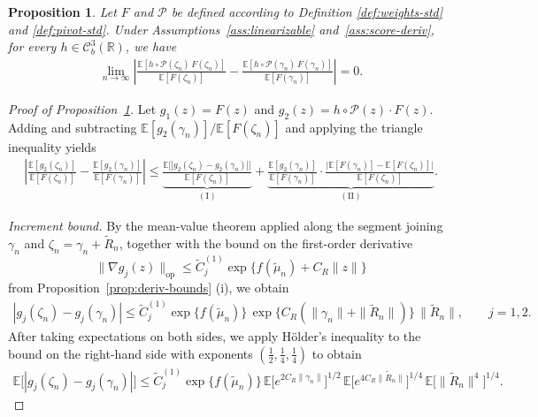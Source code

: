 \documentclass[12pt]{article}
\newcommand{\op}{\mathrm{op}}
\newtheorem{proposition}{Proposition}[section]
\newcommand{\real}{\mathbb{R}}
\newcommand{\Ee}{{\mathbb{E}}}
\newcommand{\cP}{{\mathcal{P}}}
\begin{document}
\begin{appendices}
\begin{proposition}
\label{prop:alr-remainder}
Let $F$ and $\cP$ be defined according to Definition \ref{def:weights-std} and \ref{def:pivot-std}. 
Under Assumptions~\ref{ass:linearizable} and~\ref{ass:score-deriv}, for
every $h\in\mathcal C^3_b(\real)$, we have
\begin{align}
  \label{eq:alr-swap}
  \lim_{n\to\infty}
  \left|
    \frac{\Ee[h\circ\cP(\zeta_n)\,F(\zeta_n)]}{\Ee[F(\zeta_n)]}
    -\frac{\Ee[h\circ\cP(\gamma_n)\,F(\gamma_n)]}{\Ee[F(\gamma_n)]}
  \right|=0.
\end{align}
\end{proposition}

\begin{proof}[Proof of Proposition~\ref{prop:alr-remainder}]
Let $g_1(z)=F(z)$ and $g_2(z)=h\circ\cP(z)\cdot F(z)$.
Adding and subtracting $\Ee[g_2(\gamma_n)]/\Ee[F(\zeta_n)]$
and applying the triangle inequality yields \begin{align*}
  \left|
    \frac{\Ee[g_2(\zeta_n)]}{\Ee[F(\zeta_n)]}
    -\frac{\Ee[g_2(\gamma_n)]}{\Ee[F(\gamma_n)]}
  \right|
  \le
  \underbrace{
    \frac{\Ee\big[|g_2(\zeta_n)-g_2(\gamma_n)|\big]}{\Ee[F(\zeta_n)]}
  }_{(\mathrm I)}
  +
  \underbrace{
    \frac{\Ee[g_2(\gamma_n)]}{\Ee[F(\gamma_n)]}\cdot
    \frac{\big|\Ee[F(\gamma_n)]-\Ee[F(\zeta_n)]\big|}{\Ee[F(\zeta_n)]}
  }_{(\mathrm{II})}.
\end{align*}

\medskip\noindent\textit{Increment bound.}
By the mean-value theorem applied along the segment joining $\gamma_n$ and
$\zeta_n=\gamma_n+\widetilde R_n$, together with the bound on the first-order derivative
$$\|\nabla g_j(z)\|_{\op}\le\widetilde C_j^{(1)}
\exp\{f(\widetilde\mu_n)+C_R\|z\|\}$$
from Proposition~\ref{prop:deriv-bounds} (i), we obtain
\begin{align*}
  |g_j(\zeta_n)-g_j(\gamma_n)|
  \le\widetilde C_j^{(1)}\exp\{f(\widetilde\mu_n)\}\,
     \exp\!\big\{C_R(\|\gamma_n\|+\|\widetilde R_n\|)\big\}\,
     \|\widetilde R_n\|,
  \qquad j=1,2.
\end{align*}
After taking expectations on both sides, we apply H\"older's inequality to the bound on the right-hand side with exponents $(\tfrac12,\tfrac14,\tfrac14)$ to obtain
\begin{align*}
  \Ee\big[|g_j(\zeta_n)-g_j(\gamma_n)|\big]
  \le\widetilde C_j^{(1)}\exp\{f(\widetilde\mu_n)\}\,
     \Ee\big[e^{2C_R\|\gamma_n\|}\big]^{1/2}\,
     \Ee\big[e^{4C_R\|\widetilde R_n\|}\big]^{1/4}\,
     \Ee\big[\|\widetilde R_n\|^4\big]^{1/4}.
\end{align*}


\end{proof}
\end{appendices}
\end{document}
